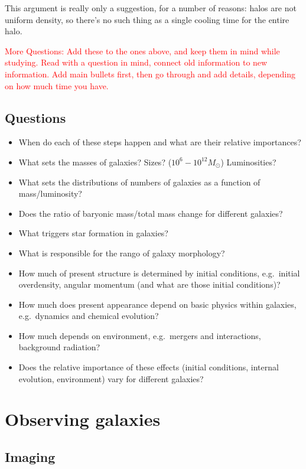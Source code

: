 \documentclass{article}
\begin{document}
This argument is really only a suggestion, for a number of reasons:
halos are not uniform density, so there's no such thing as a single
cooling time for the entire halo.

\textcolor{red}{More Questions: Add these to the ones above, and keep them in mind
while studying. Read with a question in mind, connect old
information to new information. Add main bullets first, then go
through and add details, depending on how much time you have.}

\subsection{Questions}
\begin{itemize}
    \item When do each of these steps happen and what are their
        relative importances?
    \item What sets the masses of galaxies? Sizes?
        ($10^6-10^{12}M_\odot$) Luminosities?
    \item What sets the distributions of numbers of galaxies as a
        function of mass/luminosity?
    \item Does the ratio of baryonic mass/total mass change for
        different galaxies?
    \item What triggers star formation in galaxies?
    \item What is responsible for the rango of galaxy morphology?
    \item How much of present structure is determined by initial
        conditions, e.g.\ initial overdensity, angular momentum (and what
        are those initial conditions)?
    \item How much does present appearance depend on basic physics
        within galaxies, e.g.\ dynamics and chemical evolution?
    \item How much depends on environment, e.g.\ mergers and
        interactions, background radiation?
    \item Does the relative importance of these effects (initial
        conditions, internal evolution, environment) vary for different
        galaxies?
\end{itemize}
\newpage


\newpage
\section{Observing galaxies}
\subsection{Imaging}
\end{document}
